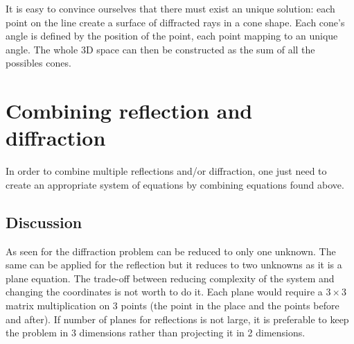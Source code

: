 \documentclass[french,10pt]{article}
\begin{document}
        It is easy to convince ourselves that there must exist an unique solution: each point on the line create a surface of diffracted rays in a cone shape. Each cone's angle is defined by the position of the point, each point mapping to an unique angle. The whole 3D space can then be constructed as the sum of all the possibles cones.

\section{Combining reflection and diffraction}

    In order to combine multiple reflections and/or diffraction, one just need to create an appropriate system of equations by combining equations found above.

    \subsection{Discussion}

        As seen for the diffraction problem can be reduced to only one unknown. The same can be applied for the reflection but it reduces to two unknowns as it is a plane equation. The trade-off between reducing complexity of the system and changing the coordinates is not worth to do it. Each plane would require a $3\times 3$ matrix multiplication on 3 points (the point in the place and the points before and after). If number of planes for reflections is not large, it is preferable to keep the problem in 3 dimensions rather than projecting it in 2 dimensions.
\end{document}
